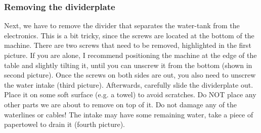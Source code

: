 \documentclass[]{article}
\begin{document}
\subsubsection{Removing the dividerplate}
\label{sec:dividerplate}
\begin{minipage}[t]{0.5\linewidth}
	\vspace{0pt}
	Next, we have to remove the divider that separates the water-tank from the electronics. This is a bit tricky, since the screws are located at the bottom of the machine. There are two screws that need to be removed, highlighted in the first picture. If you are alone, I recommend positioning the machine at the edge of the table and slightly tilting it, until you can unscrew it from the bottom (shown in second picture). Once the screws on both sides are out, you also need to unscrew the water intake (third picture). Afterwards, carefully slide the dividerplate out. Place it on some soft surface (e.g. a towel) to avoid scratches. Do NOT place any other parts we are about to remove on top of it. Do not damage any of the waterlines or cables! The intake may have some remaining water, take a piece of papertowel to drain it (fourth picture).
\end{minipage}
\hfill
\end{document}

